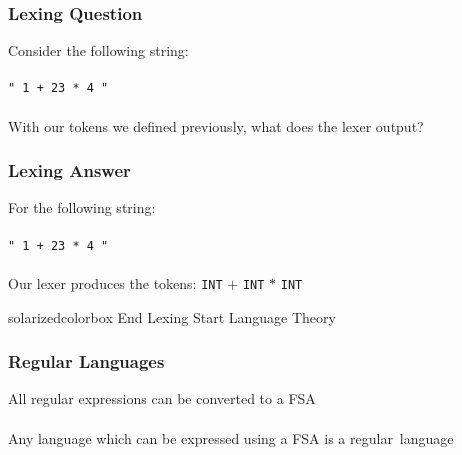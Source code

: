 \documentclass[aspectratio=169]{beamer}
\begin{document}
\begin{frame}
\frametitle{Lexing Question}

Consider the following string:\\~\\

\lstinline{" 1 + 23 * 4 "}\\~\\

With our tokens we defined previously, what does the lexer output?
\end{frame}

\begin{frame}
\frametitle{Lexing Answer}

For the following string:\\~\\

\lstinline{" 1 + 23 * 4 "}\\~\\

Our lexer produces the tokens: \lstinline{INT} $+$ \lstinline{INT} $*$
\lstinline{INT}
\end{frame}

\begin{frame}
  \begin{beamercolorbox}[wd=\paperwidth, sep=2em]{solarizedcolorbox}
    {End Lexing \hfill Start
    Language Theory}
  \end{beamercolorbox}
\end{frame}

\begin{frame}
\frametitle{Regular Languages}

All \alert{regular expressions} can be converted to a \alert{FSA}\\~\\

Any language which can be expressed using a \alert{FSA} is a
\alert{regular~language}
\end{frame}
\end{document}
